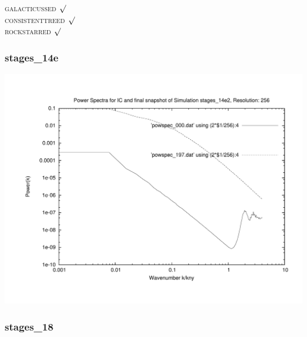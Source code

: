 \textsc{galacticussed} $\surd$ \\
\textsc{consistenttreed} $\surd$ \\ 
\textsc{rockstarred} $\surd$
% 
%
%
%
%
%
%
%

\newpage
\subsubsection{stages\_14e}
\includegraphics[scale=0.5]{r256/h100/stages_14e2/plot_powspec_stages_14e2}

% 
%
%
%
%
%
%
%




\newpage
\subsubsection{stages\_18}

